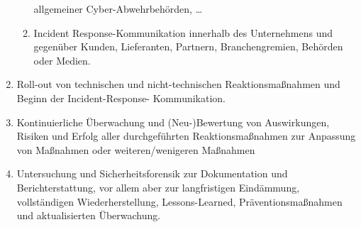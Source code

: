 \begin{enumerate}
\begin{enumerate}
        allgemeiner Cyber-Abwehrbehörden, …
        \item Incident Response-Kommunikation innerhalb des Unternehmens und gegenüber Kunden, Lieferanten, 
        Partnern, Branchengremien, Behörden oder Medien.
    \end{enumerate}
    \item Roll-out von technischen und nicht-technischen Reaktionsmaßnahmen und Beginn der Incident-Response-
    Kommunikation.
    \item Kontinuierliche Überwachung und (Neu-)Bewertung von Auswirkungen, Risiken und Erfolg aller 
    durchgeführten Reaktionsmaßnahmen zur Anpassung von Maßnahmen oder weiteren/wenigeren Maßnahmen
    \item Untersuchung und Sicherheitsforensik zur Dokumentation und Berichterstattung, vor allem aber zur 
    langfristigen Eindämmung, vollständigen Wiederherstellung, Lessons-Learned, Präventionsmaßnahmen und 
    aktualisierten Überwachung.
\end{enumerate}
